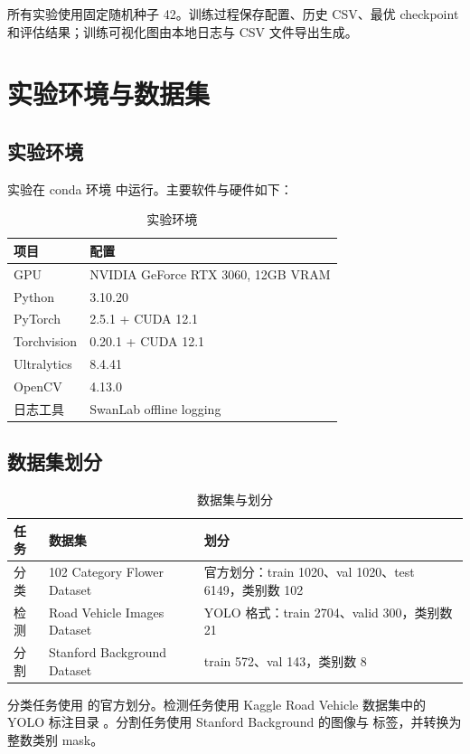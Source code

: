 \documentclass[UTF8,a4paper,11pt]{ctexart}
\begin{document}
所有实验使用固定随机种子 42。训练过程保存配置、历史 CSV、最优 checkpoint 和评估结果；训练可视化图由本地日志与 CSV 文件导出生成。

\section{实验环境与数据集}

\subsection{实验环境}

实验在 conda 环境  中运行。主要软件与硬件如下：

\begin{table}[H]
\centering
\caption{实验环境}
\begin{tabular}{ll}
\toprule
项目 & 配置 \\
\midrule
GPU & NVIDIA GeForce RTX 3060, 12GB VRAM \\
Python & 3.10.20 \\
PyTorch & 2.5.1 + CUDA 12.1 \\
Torchvision & 0.20.1 + CUDA 12.1 \\
Ultralytics & 8.4.41 \\
OpenCV & 4.13.0 \\
日志工具 & SwanLab offline logging \\
\bottomrule
\end{tabular}
\end{table}

\subsection{数据集划分}

\begin{table}[H]
\centering
\caption{数据集与划分}
\begin{tabularx}{\textwidth}{lXl}
\toprule
任务 & 数据集 & 划分 \\
\midrule
分类 & 102 Category Flower Dataset & 官方划分：train 1020、val 1020、test 6149，类别数 102 \\
检测 & Road Vehicle Images Dataset & YOLO 格式：train 2704、valid 300，类别数 21 \\
分割 & Stanford Background Dataset & train 572、val 143，类别数 8 \\
\bottomrule
\end{tabularx}
\end{table}

分类任务使用  的官方划分。检测任务使用 Kaggle Road Vehicle 数据集中的 YOLO 标注目录 。分割任务使用 Stanford Background 的图像与  标签，并转换为整数类别 mask。
\end{document}
